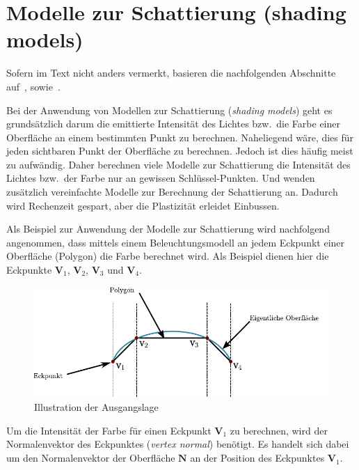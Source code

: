 
\section{Modelle zur Schattierung (shading models)}
\label{sec:shading}

Sofern im Text nicht anders vermerkt, basieren die nachfolgenden
Abschnitte auf~\cite[S. 734–739]{foley_computer_1996},
sowie~\cite{hughes_computer_2013}.

Bei der Anwendung von Modellen zur Schattierung (\textit{shading
models}) geht es grundsätzlich darum die emittierte Intensität des
Lichtes bzw.\ die Farbe einer Oberfläche an einem bestimmten Punkt zu
berechnen. Naheliegend wäre, dies für jeden sichtbaren Punkt der
Oberfläche zu berechnen. Jedoch ist dies häufig meist zu aufwändig.
Daher berechnen viele Modelle zur Schattierung die Intensität des
Lichtes bzw.\ der Farbe nur an gewissen Schlüssel-Punkten. Und wenden
zusätzlich vereinfachte Modelle zur Berechnung der Schattierung an.
Dadurch wird Rechenzeit gespart, aber die Plastizität erleidet Einbussen.

Als Beispiel zur Anwendung der Modelle zur Schattierung wird nachfolgend
angenommen, dass mittels einem Beleuchtungsmodell an jedem Eckpunkt einer
Oberfläche (Polygon) die Farbe berechnet wird. Als Beispiel dienen hier die
Eckpunkte $\bm{V}_{1}$, $\bm{V}_{2}$, $\bm{V}_{3}$ und $\bm{V}_{4}$.

\begin{figure}[H]
    \centering
    \includegraphics{img/shading_mesh.pdf}
    \caption{Illustration der Ausgangslage\protect\footnotemark}\label{
        fig:shading_mesh_illustration}
\end{figure}

Um die Intensität der Farbe für einen Eckpunkt $\bm{V}_{1}$ zu
berechnen, wird der Normalenvektor des Eckpunktes (\textit{vertex
    normal}) benötigt. Es handelt sich dabei um den Normalenvektor der
Oberfläche $\bm{N}$ an der Position des Eckpunktes $\bm{V}_{1}$.

